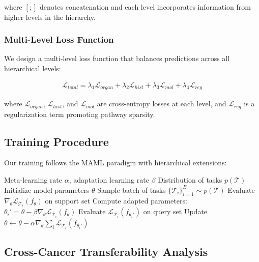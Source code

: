 \documentclass{article}
\begin{document}
where $[;]$ denotes concatenation and each level incorporates information from higher levels in the hierarchy.

\subsubsection{Multi-Level Loss Function}

We design a multi-level loss function that balances predictions across all hierarchical levels:

\begin{align}
\mathcal{L}_{total} = \lambda_1 \mathcal{L}_{organ} + \lambda_2 \mathcal{L}_{hist} + \lambda_3 \mathcal{L}_{mol} + \lambda_4 \mathcal{L}_{reg}
\end{align}

where $\mathcal{L}_{organ}$, $\mathcal{L}_{hist}$, and $\mathcal{L}_{mol}$ are cross-entropy losses at each level, and $\mathcal{L}_{reg}$ is a regularization term promoting pathway sparsity.

\subsection{Training Procedure}

Our training follows the MAML paradigm with hierarchical extensions:

\begin{algorithm}
\caption{Hierarchical MAML for Cancer Classification}
\begin{algorithmic}[1]
\REQUIRE Meta-learning rate $\alpha$, adaptation learning rate $\beta$
\REQUIRE Distribution of tasks $p(\mathcal{T})$
\STATE Initialize model parameters $\theta$
\STATE Sample batch of tasks $\{\mathcal{T}_i\}_{i=1}^B \sim p(\mathcal{T})$
\STATE Evaluate $\nabla_\theta \mathcal{L}_{\mathcal{T}_i}(f_\theta)$ on support set
\STATE Compute adapted parameters: $\theta_i' = \theta - \beta \nabla_\theta \mathcal{L}_{\mathcal{T}_i}(f_\theta)$
\STATE Evaluate $\mathcal{L}_{\mathcal{T}_i}(f_{\theta_i'})$ on query set
\ENDFOR
\STATE Update $\theta \leftarrow \theta - \alpha \nabla_\theta \sum_i \mathcal{L}_{\mathcal{T}_i}(f_{\theta_i'})$
\ENDWHILE
\end{algorithmic}
\end{algorithm}

\subsection{Cross-Cancer Transferability Analysis}
\end{document}
